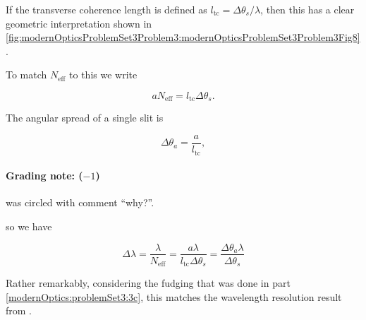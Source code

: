 {If the transverse coherence length is defined as $l_{\mathrm{tc}} = \Delta \theta_s/\lambda$, then this has a clear geometric interpretation shown in \cref{fig:modernOpticsProblemSet3Problem3:modernOpticsProblemSet3Problem3Fig8}.


To match $N_{\mathrm{eff}}$ to this we write

\begin{dmath}\label{eqn:modernOptics:problemSet3:3:1000}
a N_{\mathrm{eff}} = l_{\mathrm{tc}} \Delta \theta_s.
\end{dmath}

The angular spread of a single slit is

\begin{dmath}\label{eqn:modernOptics:problemSet3:3:1020}
\Delta \theta_a = \frac{a}{l_{\mathrm{tc}}},
\end{dmath}

\paragraph{Grading note: ($-1$)}
 was circled with comment ``why?''.

so we have

\begin{dmath}\label{eqn:modernOptics:problemSet3:3:1040}
\Delta \lambda
= \frac{\lambda}{ N_{\mathrm{eff}} }
= \frac{a \lambda}{
l_{\mathrm{tc}} \Delta \theta_s
}
=
\frac{\Delta \theta_a \lambda}{
\Delta \theta_s
}
\end{dmath}

Rather remarkably, considering the fudging that was done in part \ref{modernOptics:problemSet3:3c}, this matches the wavelength resolution result from .

} %
